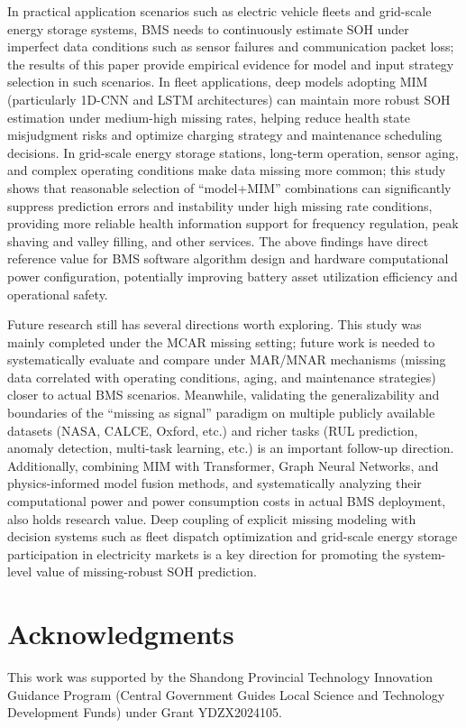 \documentclass[5p,times]{elsarticle}
\begin{document}
In practical application scenarios such as electric vehicle fleets and grid-scale energy storage systems, BMS needs to continuously estimate SOH under imperfect data conditions such as sensor failures and communication packet loss; the results of this paper provide empirical evidence for model and input strategy selection in such scenarios. In fleet applications, deep models adopting MIM (particularly 1D-CNN and LSTM architectures) can maintain more robust SOH estimation under medium-high missing rates, helping reduce health state misjudgment risks and optimize charging strategy and maintenance scheduling decisions. In grid-scale energy storage stations, long-term operation, sensor aging, and complex operating conditions make data missing more common; this study shows that reasonable selection of ``model+MIM'' combinations can significantly suppress prediction errors and instability under high missing rate conditions, providing more reliable health information support for frequency regulation, peak shaving and valley filling, and other services. The above findings have direct reference value for BMS software algorithm design and hardware computational power configuration, potentially improving battery asset utilization efficiency and operational safety.

Future research still has several directions worth exploring. This study was mainly completed under the MCAR missing setting; future work is needed to systematically evaluate and compare under MAR/MNAR mechanisms (missing data correlated with operating conditions, aging, and maintenance strategies) closer to actual BMS scenarios. Meanwhile, validating the generalizability and boundaries of the ``missing as signal'' paradigm on multiple publicly available datasets (NASA, CALCE, Oxford, etc.) and richer tasks (RUL prediction, anomaly detection, multi-task learning, etc.) is an important follow-up direction. Additionally, combining MIM with Transformer, Graph Neural Networks, and physics-informed model fusion methods, and systematically analyzing their computational power and power consumption costs in actual BMS deployment, also holds research value. Deep coupling of explicit missing modeling with decision systems such as fleet dispatch optimization and grid-scale energy storage participation in electricity markets is a key direction for promoting the system-level value of missing-robust SOH prediction.

\section*{Acknowledgments}

This work was supported by the Shandong Provincial Technology Innovation Guidance Program (Central Government Guides Local Science and Technology Development Funds) under Grant YDZX2024105.




\end{document}

